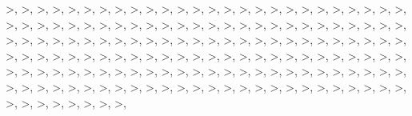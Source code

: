 \documentclass[12pt,]{article}
\begin{document}
\textgreater{}, \textgreater{}, \textgreater{}, \textgreater{},
\textgreater{}, \textgreater{}, \textgreater{}, \textgreater{},
\textgreater{}, \textgreater{}, \textgreater{}, \textgreater{},
\textgreater{}, \textgreater{}, \textgreater{}, \textgreater{},
\textgreater{}, \textgreater{}, \textgreater{}, \textgreater{},
\textgreater{}, \textgreater{}, \textgreater{}, \textgreater{},
\textgreater{}, \textgreater{}, \textgreater{}, \textgreater{},
\textgreater{}, \textgreater{}, \textgreater{}, \textgreater{},
\textgreater{}, \textgreater{}, \textgreater{}, \textgreater{},
\textgreater{}, \textgreater{}, \textgreater{}, \textgreater{},
\textgreater{}, \textgreater{}, \textgreater{}, \textgreater{},
\textgreater{}, \textgreater{}, \textgreater{}, \textgreater{},
\textgreater{}, \textgreater{}, \textgreater{}, \textgreater{},
\textgreater{}, \textgreater{}, \textgreater{}, \textgreater{},
\textgreater{}, \textgreater{}, \textgreater{}, \textgreater{},
\textgreater{}, \textgreater{}, \textgreater{}, \textgreater{},
\textgreater{}, \textgreater{}, \textgreater{}, \textgreater{},
\textgreater{}, \textgreater{}, \textgreater{}, \textgreater{},
\textgreater{}, \textgreater{}, \textgreater{}, \textgreater{},
\textgreater{}, \textgreater{}, \textgreater{}, \textgreater{},
\textgreater{}, \textgreater{}, \textgreater{}, \textgreater{},
\textgreater{}, \textgreater{}, \textgreater{}, \textgreater{},
\textgreater{}, \textgreater{}, \textgreater{}, \textgreater{},
\textgreater{}, \textgreater{}, \textgreater{}, \textgreater{},
\textgreater{}, \textgreater{}, \textgreater{}, \textgreater{},
\textgreater{}, \textgreater{}, \textgreater{}, \textgreater{},
\textgreater{}, \textgreater{}, \textgreater{}, \textgreater{},
\textgreater{}, \textgreater{}, \textgreater{}, \textgreater{},
\textgreater{}, \textgreater{}, \textgreater{}, \textgreater{},
\textgreater{}, \textgreater{}, \textgreater{}, \textgreater{},
\textgreater{}, \textgreater{}, \textgreater{}, \textgreater{},
\textgreater{}, \textgreater{}, \textgreater{}, \textgreater{},
\textgreater{}, \textgreater{}, \textgreater{}, \textgreater{},
\textgreater{}, \textgreater{}, \textgreater{}, \textgreater{},
\textgreater{}, \textgreater{}, \textgreater{}, \textgreater{},
\textgreater{}, \textgreater{}, \textgreater{}, \textgreater{},
\textgreater{}, \textgreater{}, \textgreater{}, \textgreater{},
\textgreater{}, \textgreater{}, \textgreater{}, \textgreater{},
\textgreater{}, \textgreater{}, \textgreater{}, \textgreater{},
\textgreater{}, \textgreater{}, \textgreater{}, \textgreater{},
\textgreater{}, \textgreater{}, \textgreater{}, \textgreater{},
\end{document}
